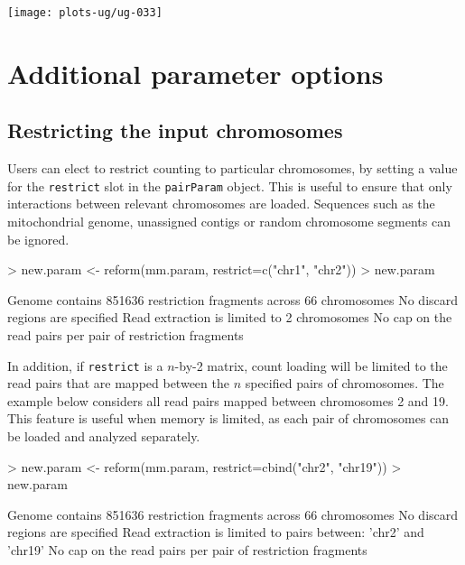 \documentclass[12pt]{report}
\renewenvironment{Schunk}{\vspace{0pt}}{\vspace{0pt}}
\newcommand{\code}[1]{{\small\texttt{#1}}}
\begin{document}
\begin{center}
\texttt{[image: plots-ug/ug-033]}
\end{center}

\section{Additional parameter options}

\subsection{Restricting the input chromosomes}
\label{sec:restrictchr}

Users can elect to restrict counting to particular chromosomes, by setting a value for the \code{restrict} slot in the \code{pairParam} object.
This is useful to ensure that only interactions between relevant chromosomes are loaded.
Sequences such as the mitochondrial genome, unassigned contigs or random chromosome segments can be ignored.

\begin{Schunk}
\begin{Sinput}
> new.param <- reform(mm.param, restrict=c("chr1", "chr2"))
> new.param
\end{Sinput}
\begin{Soutput}
Genome contains 851636 restriction fragments across 66 chromosomes
No discard regions are specified
Read extraction is limited to 2 chromosomes
No cap on the read pairs per pair of restriction fragments
\end{Soutput}
\end{Schunk}

In addition, if \code{restrict} is a $n$-by-2 matrix, count loading will be limited to the read pairs that are mapped between the $n$ specified pairs of chromosomes.
The example below considers all read pairs mapped between chromosomes 2 and 19.
This feature is useful when memory is limited, as each pair of chromosomes can be loaded and analyzed separately.

\begin{Schunk}
\begin{Sinput}
> new.param <- reform(mm.param, restrict=cbind("chr2", "chr19"))
> new.param
\end{Sinput}
\begin{Soutput}
Genome contains 851636 restriction fragments across 66 chromosomes
No discard regions are specified
Read extraction is limited to pairs between:
	'chr2' and 'chr19'
No cap on the read pairs per pair of restriction fragments
\end{Soutput}
\end{Schunk}
\end{document}

